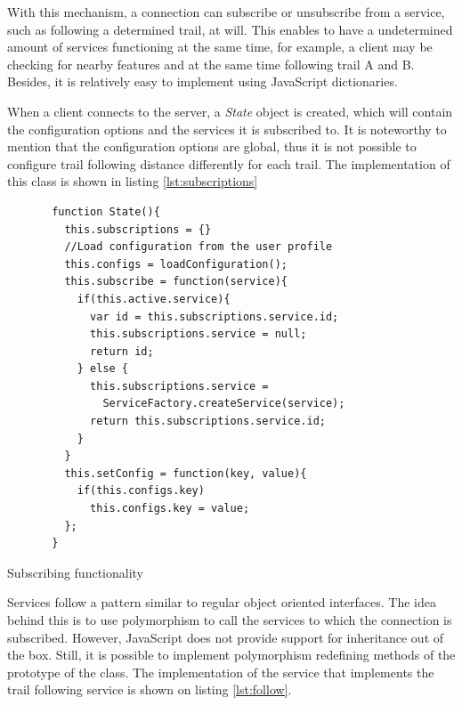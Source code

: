 With this mechanism, a connection can subscribe or unsubscribe from a service, such as following a determined trail, at will. This enables to have a undetermined amount of services functioning at the same time, for example, a client may be checking for nearby features and at the same time following trail A and B. Besides, it is relatively easy to implement using JavaScript dictionaries.

When a client connects to the server, a \textit{State} object is created, which will contain the configuration options and the services it is subscribed to. It is noteworthy to mention that the configuration options are global, thus it is not possible to configure trail following distance differently for each trail. The implementation of this class is shown in listing \ref{lst:subscriptions}

\begin{listing}[ht]\centering
  \begin{minipage}{.8\textwidth}
    \begin{verbatim}
       function State(){
         this.subscriptions = {}
         //Load configuration from the user profile
         this.configs = loadConfiguration(); 
         this.subscribe = function(service){
           if(this.active.service){
             var id = this.subscriptions.service.id;
             this.subscriptions.service = null;
             return id;
           } else {
             this.subscriptions.service = 
               ServiceFactory.createService(service);
             return this.subscriptions.service.id;
           }
         }
         this.setConfig = function(key, value){
           if(this.configs.key)
             this.configs.key = value;
         };
       }
    \end{verbatim}
  \end{minipage}
  \caption{Subscribing functionality}\label{lst:subscriptions}
\end{listing}

Services follow a pattern similar to regular object oriented interfaces. The idea behind this is to use polymorphism to call the services to which the connection is subscribed. However, JavaScript does not provide support for inheritance out of the box. Still, it is possible to implement polymorphism redefining methods of the prototype of the class. The implementation of the service that implements the trail following service is shown on listing \ref{lst:follow}.

